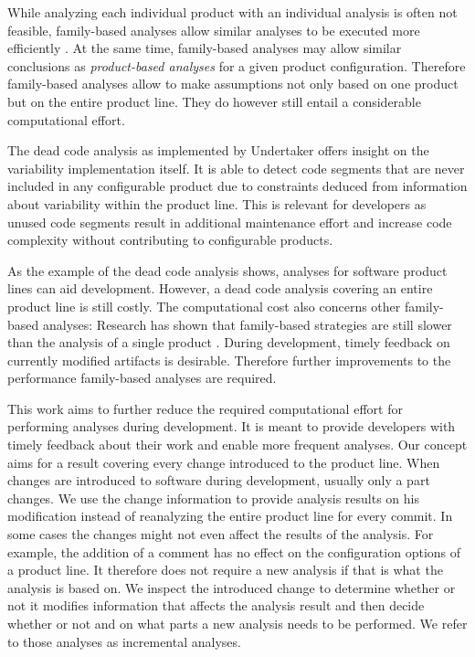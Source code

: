 \documentclass[a4paper]{article}
\begin{document}
While analyzing each individual product with an individual analysis is often not feasible, family-based analyses allow similar analyses to be executed more efficiently \cite{Thum:2014:CSA:2620784.2580950}. At the same time, family-based analyses may allow similar conclusions as \emph{product-based analyses} for a given product configuration. Therefore family-based analyses allow to make assumptions not only based on one product but on the entire product line. They do however still entail a considerable computational effort.

The dead code analysis as implemented by Undertaker \cite{Tartler:2011:FCC:1966445.1966451} offers insight on the variability implementation itself. It is able to detect code segments that are never included in any configurable product due to constraints deduced from information about variability within the product line. This is relevant for developers as unused code segments result in additional maintenance effort and increase code complexity without contributing to configurable products. 

As the example of the dead code analysis shows, analyses for software product lines can aid development. However, a dead code analysis covering an entire product line is still costly. The computational cost also concerns other family-based analyses: Research has shown that family-based strategies are still slower than the analysis of a single product \cite{Thum:2014:CSA:2620784.2580950}. During development, timely feedback on currently modified artifacts is desirable. Therefore further improvements to the performance family-based analyses are required.  

This work aims to further reduce the required computational effort for performing analyses during development. It is meant to provide developers with timely feedback about their work and enable more frequent analyses. Our concept aims for a result covering every change introduced to the product line. When changes are introduced to software during development, usually only a part changes. We use the change information to provide analysis results on his modification instead of reanalyzing the entire product line for every commit. In some cases the changes might not even affect the results of the analysis. For example, the addition of a comment has no effect on the configuration options of a product line. It therefore does not require a new analysis if that is what the analysis is based on. We inspect the introduced change to determine whether or not it modifies information that affects the analysis result and then decide whether or not and on what parts a new analysis needs to be performed. We refer to those analyses as incremental analyses.
\end{document}
